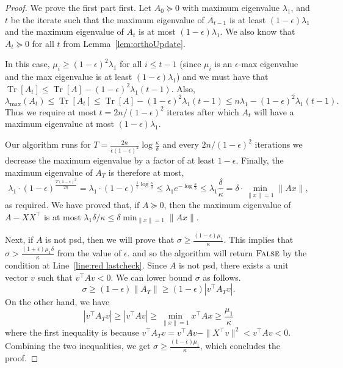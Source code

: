 \documentclass[11pt]{article}
\DeclareMathOperator{\Tr}{Tr}
\newcommand\vv{\boldsymbol{\mathit{v}}}
\newcommand\xx{\boldsymbol{\mathit{x}}}
\renewcommand\AA{\boldsymbol{\mathit{A}}}
\newcommand\XX{\boldsymbol{\mathit{X}}}
\begin{document}
\begin{proof}
We prove the first part first. Let $\AA_0\succeq 0$ with maximum eigenvalue $\lambda_1$, and $t$ be the iterate such that the maximum eigenvalue of $\AA_{t-1}$ is at least $(1-\epsilon)\lambda_1$ and the maximum eigenvalue of $\AA_t$ is at most $(1-\epsilon)\lambda_1$. We also know that $\AA_t\succeq 0$ for all $t$ from Lemma~\ref{lem:orthoUpdate}.

In this case, $\mu_i \geq (1-\epsilon)^2\lambda_1$ for all $i\leq t-1$ (since $\mu_i$ is an $\epsilon$-max eigenvalue and the max eigenvalue is at least $(1-\epsilon)\lambda_1$) and we must have that $\Tr[\AA_t]\leq \Tr[\AA] - (1-\epsilon)^2\lambda_1(t-1)$. Also,
\[
\lambda_{\max}(\AA_t) \leq \Tr[\AA_t]\leq \Tr[\AA] - (1-\epsilon)^2\lambda_1(t-1) \leq  n\lambda_1 - (1-\epsilon)^2\lambda_1(t-1).
\]
Thus we require at most $t = 2n/(1-\epsilon)^2$ iterates after which $\AA_t$ will have a maximum eigenvalue at most $(1-\epsilon)\lambda_1$. 

Our algorithm runs for $T = \frac{2n}{\epsilon(1-\epsilon)^2}\log \frac{\kappa}{\delta}$ and every $2n/(1-\epsilon)^2$ iterations we decrease the maximum eigenvalue by a factor of at least $1-\epsilon$. Finally, the maximum eigenvalue of $\AA_T$ is therefore at most,
\[
\lambda_1 \cdot (1-\epsilon)^{\frac{T(1-\epsilon)^2}{2n}}=\lambda_1 \cdot (1-\epsilon)^{\frac{1}{\epsilon}\log \frac{\kappa}{\delta}} \leq \lambda_1 e^{-\log \frac{\kappa}{\delta}}\leq \lambda_1 \frac{\delta}{\kappa} = \delta \cdot \min_{\|\xx\|=1}\|\AA\xx\|, 
\] 
as required. We have proved that, if $\AA\succeq 0$, then the maximum eigenvalue of $\AA-\XX\XX^{\top}$ is at most $\lambda_1\delta/\kappa \leq \delta \min_{\|\xx\|=1}\|\AA\xx\|$.

Next, if $\AA$ is not psd, then we will prove that $\sigma\ge\frac{(1-\epsilon)\mu_{1}}{\kappa}.$ This implies that $\sigma>\frac{(1+\epsilon)\mu_{1}\delta}{\kappa}$ from the value of $\epsilon$.  
and so the algorithm will return $\textsc{False}$ by the condition at Line~\ref{line:red lastcheck}. Since $\AA$ is not psd, there exists a unit vector $\vv$ such that $\vv^{\top}\AA\vv<0$. We can lower bound $\sigma$ as follows.
\[
\sigma\ge(1-\epsilon)\|\AA_{T}\|\ge(1-\epsilon)|\vv^{\top}\AA_{T}\vv|.
\]
On the other hand, we have
\[
|\vv^{\top}\AA_{T}\vv|\ge|\vv^{\top}\AA\vv|\ge\min_{\|\xx\|=1}\xx^{\top}\AA\xx\ge\frac{\mu_{1}}{\kappa}
\]
where the first inequality is because $\vv^{\top}\AA_{T}\vv=\vv^{\top}\AA\vv-\|\XX^{\top}\vv\|^{2}<\vv^{\top}\AA\vv<0$. Combining the two inequalities, we get $\sigma\ge\frac{(1-\epsilon)\mu_{1}}{\kappa}$, which concludes the proof.
 \end{proof}
\end{document}
